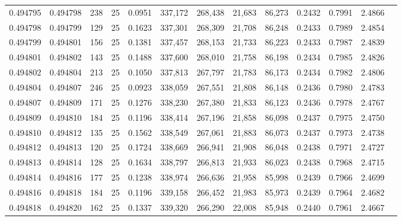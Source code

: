 \begin{tabular}{rrrrrrrrrrrrr}
0.494795 & 0.494798 &   238 &  25 &                                     0.0951 & 337,172 & 268,438 &  21,683 &  86,273 & 0.2432 & 0.7991 & 2.4866 \\
0.494798 & 0.494799 &   129 &  25 &                                     0.1623 & 337,301 & 268,309 &  21,708 &  86,248 & 0.2433 & 0.7989 & 2.4854 \\
0.494799 & 0.494801 &   156 &  25 &                                     0.1381 & 337,457 & 268,153 &  21,733 &  86,223 & 0.2433 & 0.7987 & 2.4839 \\
0.494801 & 0.494802 &   143 &  25 &                                     0.1488 & 337,600 & 268,010 &  21,758 &  86,198 & 0.2434 & 0.7985 & 2.4826 \\
0.494802 & 0.494804 &   213 &  25 &                                     0.1050 & 337,813 & 267,797 &  21,783 &  86,173 & 0.2434 & 0.7982 & 2.4806 \\
0.494804 & 0.494807 &   246 &  25 &                                     0.0923 & 338,059 & 267,551 &  21,808 &  86,148 & 0.2436 & 0.7980 & 2.4783 \\
0.494807 & 0.494809 &   171 &  25 &                                     0.1276 & 338,230 & 267,380 &  21,833 &  86,123 & 0.2436 & 0.7978 & 2.4767 \\
0.494809 & 0.494810 &   184 &  25 &                                     0.1196 & 338,414 & 267,196 &  21,858 &  86,098 & 0.2437 & 0.7975 & 2.4750 \\
0.494810 & 0.494812 &   135 &  25 &                                     0.1562 & 338,549 & 267,061 &  21,883 &  86,073 & 0.2437 & 0.7973 & 2.4738 \\
0.494812 & 0.494813 &   120 &  25 &                                     0.1724 & 338,669 & 266,941 &  21,908 &  86,048 & 0.2438 & 0.7971 & 2.4727 \\
0.494813 & 0.494814 &   128 &  25 &                                     0.1634 & 338,797 & 266,813 &  21,933 &  86,023 & 0.2438 & 0.7968 & 2.4715 \\
0.494814 & 0.494816 &   177 &  25 &                                     0.1238 & 338,974 & 266,636 &  21,958 &  85,998 & 0.2439 & 0.7966 & 2.4699 \\
0.494816 & 0.494818 &   184 &  25 &                                     0.1196 & 339,158 & 266,452 &  21,983 &  85,973 & 0.2439 & 0.7964 & 2.4682 \\
0.494818 & 0.494820 &   162 &  25 &                                     0.1337 & 339,320 & 266,290 &  22,008 &  85,948 & 0.2440 & 0.7961 & 2.4667 \\

\end{tabular}
